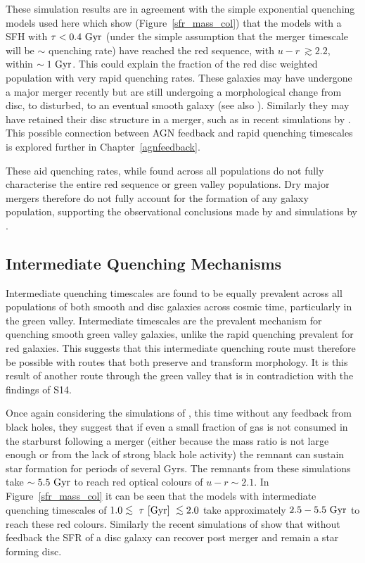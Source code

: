 These simulation results are in agreement with the simple exponential quenching models used here which show (Figure~\ref{sfr_mass_col}) that the models with a SFH with $\tau < 0.4~\rm{Gyr}$ (under the simple assumption that the merger timescale will be $\sim$ quenching rate) have reached the red sequence, with $u-r ~\gtrsim 2.2$, within $\sim1~\rm{Gyr}$. This could explain the fraction of the red disc weighted population with very rapid quenching rates. These galaxies may have undergone a major merger recently but are still undergoing a morphological change from disc, to disturbed, to an eventual smooth galaxy (see also \citealt{vdW09}). Similarly they may have retained their disc structure in a merger, such as in recent simulations by \citet{pontzen16}. This possible connection between AGN feedback and rapid quenching timescales is explored further in Chapter~\ref{agnfeedback}. 

These aid quenching rates, while found across all populations do not fully characterise the entire red sequence or green valley populations. Dry major mergers therefore do not fully account for the formation of any galaxy population, supporting the observational conclusions made by \citet{Bell07,Bundy07, kaviraj14a} and simulations by \citet{Genel08}. 

\subsection{Intermediate Quenching Mechanisms}\label{int}

Intermediate quenching timescales are found to be equally prevalent across  all populations of both smooth and disc galaxies across cosmic time,  particularly in the green valley. Intermediate timescales are the prevalent mechanism for quenching smooth green valley galaxies, unlike the rapid quenching prevalent for red galaxies. This suggests that this intermediate quenching route must therefore be possible with routes that both preserve and transform morphology. It is this result of another route through the green valley that is in contradiction with the findings of S14. 

Once again considering the simulations of \citet{springel05b}, this time without any feedback from black holes, they suggest that if even a small fraction of gas is not consumed in the starburst following a merger (either because the mass ratio is not large enough or from the lack of strong black hole activity) the remnant can sustain star formation for periods of several Gyrs. The remnants from these simulations take $\sim5.5~\rm{Gyr}$ to reach red optical colours of $u-r \sim 2.1$. In Figure~\ref{sfr_mass_col} it can be seen that the models with intermediate quenching timescales of $1.0 \lesssim ~\tau~\rm{[Gyr]} ~\lesssim 2.0$ take approximately $2.5-5.5~\rm{Gyr}$ to reach these red colours. Similarly the recent simulations of \citet{pontzen16} show that without feedback the SFR of a disc galaxy can recover post merger and remain a star forming disc. 

